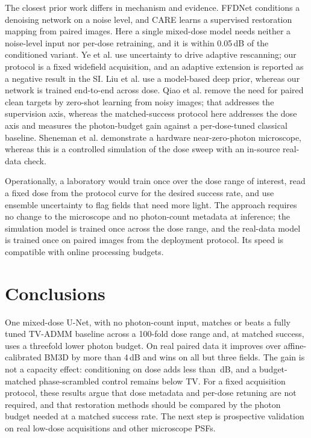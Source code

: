 \documentclass[preprint,12pt]{elsarticle}
\begin{document}
The closest prior work differs in mechanism and evidence. FFDNet conditions a
denoising network on a noise level, and CARE learns a supervised restoration
mapping from paired images. Here a single mixed-dose model needs neither a
noise-level input nor per-dose retraining, and it is within 0.05\,dB of the
conditioned variant. Ye et al. \cite{ye2025uncertainty} use uncertainty to
drive adaptive rescanning; our protocol is a fixed widefield acquisition, and
an adaptive extension is reported as a negative result in the SI. Liu et al.
\cite{liu2020degeneration} use a model-based deep prior, whereas our network is
trained end-to-end across dose. Qiao et al. \cite{qiao2024zsdeconvnet} remove
the need for paired clean targets by zero-shot learning from noisy images; that
addresses the supervision axis, whereas the matched-success protocol here
addresses the dose axis and measures the photon-budget gain against a
per-dose-tuned classical baseline. Sheneman et al. \cite{sheneman2025nearzero}
demonstrate a hardware near-zero-photon microscope, whereas this is a
controlled simulation
of the dose sweep with an in-source real-data check.

Operationally, a laboratory would train once over the dose range of interest,
read a fixed dose from the protocol curve for the desired success rate, and use
ensemble uncertainty to flag fields that need more light. The approach requires no change to the
microscope and no photon-count metadata at inference; the simulation model is
trained once across the dose range, and the real-data model is trained once on
paired images from the deployment protocol. Its speed is compatible with online
processing budgets.

\section*{Conclusions}
One mixed-dose U-Net, with no photon-count input, matches or beats a fully
tuned TV-ADMM baseline across a 100-fold dose range and, at matched success,
uses a threefold lower photon budget. On real paired data it improves over
affine-calibrated BM3D by more than 4\,dB and wins on all but three fields. The
gain is not a capacity effect: conditioning on dose adds less than
\CondStrongDelta\,dB, and a budget-matched phase-scrambled control remains below
TV. For a fixed acquisition protocol, these results argue that dose metadata
and per-dose retuning are not required, and that restoration methods should be
compared by the photon budget needed at a matched success rate. The next step
is prospective validation on real low-dose acquisitions and other microscope
PSFs.
\end{document}
